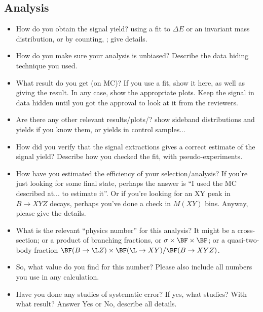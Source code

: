 \subsection*{Analysis}

\begin{itemize}

\item How do you obtain the signal yield?
 \eg using a fit to $\Delta E$ or an invariant mass distribution, 
 or by counting, \etc; give details.

\item How do you make sure your analysis is unbiased?
 Describe the data hiding technique you used.

\item What result do you get (on MC)?
 If you use a fit, show it here, as well as giving the result.
 In any case, show the appropriate plots.
 Keep the signal in data hidden until you got the approval
 to look at it from the reviewers.

\item Are there any other relevant results/plots/\etc?
 \eg show sideband distributions and yields if you know them,
 or yields in control samples...

\item How did you verify that the signal extractions gives a correct estimate of the signal yield?
 Describe how you checked the fit, \eg with pseudo-experiments.

\item How have you estimated the efficiency of your selection/analysis?
 If you're just looking for some final state, perhaps the answer is
 ``I used the MC described at... to estimate it''.
 Or if you're looking for an XY peak in $B \to XYZ$ decays,
 perhaps you've done a check in $M(XY)$ bins.
 Anyway, please give the details.

\item What is the relevant ``physics number'' for this analysis?
 It might be a cross-section; or a product of branching fractions,
 or $\sigma \times\BF\times\BF$;
 or a quasi-two-body fraction
 $\BF(B \to \L Z) \times \BF(\L \to XY) / \BF(B \to XYZ)$.

\item So, what value do you find for this number?
 Please also include all numbers you use in any calculation.

\item Have you done any studies of systematic error? If yes, what studies? With what result?
 Answer Yes or No, describe all details.

\end{itemize}

